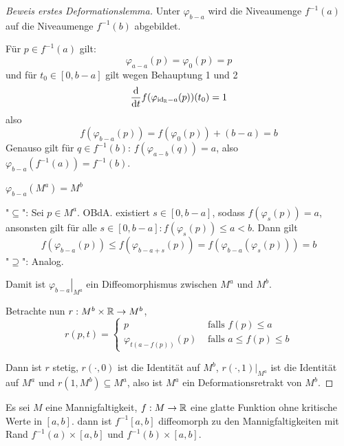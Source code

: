 \begin{proof}[Beweis erstes Deformationslemma]
     Unter $\varphi_{b-a}$ wird die Niveaumenge 
    $f^{-1}(a)$ auf die Niveaumenge $f^{-1}(b)$ abgebildet.
     
    Für $p \in f^{-1}(a)$ gilt:
    \[ \varphi_{a-a}(p) = \varphi_0(p) = p \]
    und für $t_0 \in [0, b - a]$ gilt wegen Behauptung 1 und 2
    \[ { \frac{{ \operatorname{d} } }{{ \operatorname{d} } t} }f(\varphi_{{ \operatorname{id} }_{{ \mathbb R }} - a}(p)) (t_0) = 1 \]
    also
    \[ f(\varphi_{b - a}(p)) = f(\varphi_{0}(p)) + (b - a) = b \]
    Genauso gilt für $q \in f^{-1}(b)$: $f(\varphi_{a - b}(q)) = a$, also 
    $\varphi_{b - a}(f^{-1}(a)) = f^{-1}(b)$.
    \sectiondone

     $\varphi_{b - a} (M^a) = M^b$

    "$\subseteq$": Sei $p \in M^a$. OBdA. existiert $s \in [0, b-a]$, sodass 
    $f(\varphi_s(p)) = a$, ansonsten gilt für alle 
    $s \in [0, b-a]: f(\varphi_s(p)) \leq a < b$. Dann gilt
    \[ f(\varphi_{b-a}(p)) \leq f(\varphi_{b-a+s}(p)) = f(\varphi_{b-a}(\varphi_s(p))) = b \] 
    "$\supseteq$": Analog.
    \sectiondone

    Damit ist $\left. \varphi_{b-a} \right\vert_{M^a}$ ein Diffeomorphismus zwischen
    $M^a$ und $M^b$. 

    Betrachte nun $r: M^b \times { \mathbb R } \to M^b$,
    \[  
        r(p, t) = \begin{cases}
            p & \text{ falls } f(p) \leq a \\
            \varphi_{t(a - f(p))}(p) & \text{ falls } a \leq f(p) \leq b 
        \end{cases}
    \]

    Dann ist $r$ stetig, $r(\cdot, 0)$ ist die Identität auf $M^b$, 
    $r(\cdot, 1)|_{M^a}$ ist die Identität auf $M^a$ und 
    $r(1, M^b) \subseteq M^a$, also ist $M^a$ ein Deformationsretrakt von $M^b$.

\end{proof}

\begin{corollary}
    Es sei $M$ eine Mannigfaltigkeit, $f: M \to { \mathbb R }$ eine glatte Funktion ohne
    kritische Werte in $[a, b]$. dann ist $f^{-1}[a, b]$ diffeomorph zu den
    Mannigfaltigkeiten mit Rand $f^{-1}(a) \times [a, b]$ und 
    $f^{-1}(b) \times [a, b]$.
\end{corollary}
